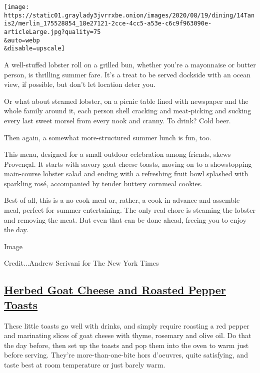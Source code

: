 \texttt{[image: https://static01.graylady3jvrrxbe.onion/images/2020/08/19/dining/14Tanis2/merlin\_175528854\_18e27121-2cce-4cc5-a53e-c6c9f963090e-articleLarge.jpg?quality=75\\\&auto=webp\\\&disable=upscale]}

A well-stuffed lobster roll on a grilled bun, whether you're a
mayonnaise or butter person, is thrilling summer fare. It's a treat to
be served dockside with an ocean view, if possible, but don't let
location deter you.

Or what about steamed lobster, on a picnic table lined with newspaper
and the whole family around it, each person shell cracking and
meat-picking and sucking every last sweet morsel from every nook and
cranny. To drink? Cold beer.

Then again, a somewhat more-structured summer lunch is fun, too.

This menu, designed for a small outdoor celebration among friends, skews
Provençal. It starts with savory goat cheese toasts, moving on to a
showstopping main-course lobster salad and ending with a refreshing
fruit bowl splashed with sparkling rosé, accompanied by tender buttery
cornmeal cookies.

Best of all, this is a no-cook meal or, rather, a
cook-in-advance-and-assemble meal, perfect for summer entertaining. The
only real chore is steaming the lobster and removing the meat. But even
that can be done ahead, freeing you to enjoy the day.

Image

Credit...Andrew Scrivani for The New York Times

\hypertarget{herbed-goat-cheese-and-roasted-pepper-toasts}{%
\subsection{\texorpdfstring{\href{https://cooking.nytimes3xbfgragh.onion/recipes/1021321-herbed-goat-cheese-and-roasted-pepper-toasts}{Herbed
Goat Cheese and Roasted Pepper
Toasts}}{Herbed Goat Cheese and Roasted Pepper Toasts}}\label{herbed-goat-cheese-and-roasted-pepper-toasts}}

These little toasts go well with drinks, and simply require roasting a
red pepper and marinating slices of goat cheese with thyme, rosemary and
olive oil. Do that the day before, then set up the toasts and pop them
into the oven to warm just before serving. They're more-than-one-bite
hors d'oeuvres, quite satisfying, and taste best at room temperature or
just barely warm.

